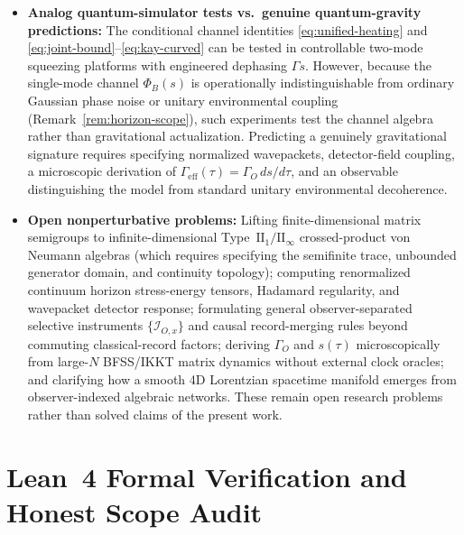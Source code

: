 \documentclass[11pt,a4paper]{article}
\theoremstyle{definition}
\theoremstyle{remark}
\newcommand{\cI}{\mathcal{I}}
\newcommand{\1}{\mathbf{1}}
\begin{document}
\begin{itemize}
  \item \textbf{Analog quantum-simulator tests vs.\ genuine quantum-gravity predictions:} The conditional channel identities \eqref{eq:unified-heating} and \eqref{eq:joint-bound}--\eqref{eq:kay-curved} can be tested in controllable two-mode squeezing platforms with engineered dephasing $\Gamma s$. However, because the single-mode channel $\Phi_B(s)$ is operationally indistinguishable from ordinary Gaussian phase noise or unitary environmental coupling (Remark~\ref{rem:horizon-scope}), such experiments test the channel algebra rather than gravitational actualization. Predicting a genuinely gravitational signature requires specifying normalized wavepackets, detector-field coupling, a microscopic derivation of $\Gamma_{\mathrm{eff}}(\tau) = \Gamma_O\,ds/d\tau$, and an observable distinguishing the model from standard unitary environmental decoherence.
  \item \textbf{Open nonperturbative problems:} Lifting finite-dimensional matrix semigroups to infinite-dimensional Type~$\mathrm{II}_1/\mathrm{II}_\infty$ crossed-product von Neumann algebras \cite{CLPW2023,DeVuyst2025} (which requires specifying the semifinite trace, unbounded generator domain, and continuity topology); computing renormalized continuum horizon stress-energy tensors, Hadamard regularity, and wavepacket detector response; formulating general observer-separated selective instruments $\{\cI_{O,x}\}$ and causal record-merging rules beyond commuting classical-record factors; deriving $\Gamma_O$ and $s(\tau)$ microscopically from large-$N$ BFSS/IKKT matrix dynamics \cite{BFSS1997,IKKT1997,Choudhury2024} without external clock oracles; and clarifying how a smooth 4D Lorentzian spacetime manifold emerges from observer-indexed algebraic networks. These remain open research problems rather than solved claims of the present work.
\end{itemize}

\section{Lean~4 Formal Verification and Honest Scope Audit}\label{sec:lean}
\end{document}
